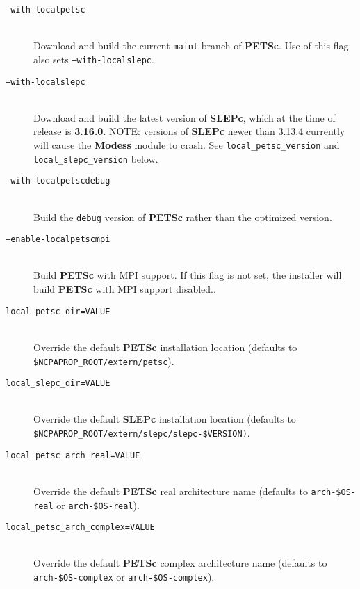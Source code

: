 \begin{description}
\item[\texttt{--with-localpetsc}]\hfill \\
\noindent
Download and build the current \texttt{maint} branch of \textbf{PETSc}.  Use of this flag also sets \texttt{--with-localslepc}.

\item[\texttt{--with-localslepc}]\hfill \\
\noindent
Download and build the latest version of \textbf{SLEPc}, which at the time of release is \textbf{3.16.0}.  NOTE: versions of \textbf{SLEPc} newer than 3.13.4 currently will cause the \textbf{Modess} module to crash.  See \texttt{local\_petsc\_version} and \texttt{local\_slepc\_version} below.

\item[\texttt{--with-localpetscdebug}]\hfill \\
\noindent
Build the \texttt{debug} version of \textbf{PETSc} rather than the optimized version.

\item[\texttt{--enable-localpetscmpi}]\hfill \\
\noindent
Build \textbf{PETSc} with MPI support.  If this flag is not set, the installer will build \textbf{PETSc} with MPI support disabled..

\item[\texttt{local\_petsc\_dir=VALUE}]\hfill \\
\noindent
Override the default \textbf{PETSc} installation location (defaults to \texttt{\$NCPAPROP\_ROOT/extern/petsc}).

\item[\texttt{local\_slepc\_dir=VALUE}]\hfill \\
\noindent
Override the default \textbf{SLEPc} installation location (defaults to \texttt{\$NCPAPROP\_ROOT/extern/slepc/slepc-\$VERSION)}.

\item[\texttt{local\_petsc\_arch\_real=VALUE}]\hfill \\
\noindent
Override the default \textbf{PETSc} real architecture name (defaults to \texttt{arch-\$OS-real} or \texttt{arch-\$OS-real}).

\item[\texttt{local\_petsc\_arch\_complex=VALUE}]\hfill \\
\noindent
Override the default \textbf{PETSc} complex architecture name (defaults to \texttt{arch-\$OS-complex} or \texttt{arch-\$OS-complex}).


\end{description}
